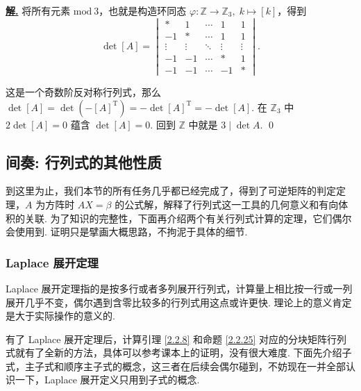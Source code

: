 \documentclass[10pt,openany]{article}
\theoremstyle{thmstyle} %
\theoremstyle{defstyle} %
\theoremstyle{prostyle} %
\theoremstyle{exastyle}
\theoremstyle{remstyle}
\newenvironment{solution}{\par\underline{\textbf{解.}} \;\fangsong}{\qed\par}
\newcommand{\T}{^{\text{T}}}
\begin{document}
\begin{solution}
	将所有元素 \( \text{mod} \ 3 \)，也就是构造环同态 \( \varphi: \mathbb{Z} \to \mathbb{Z}_3, \; k \mapsto [k] \)，得到
	\[ \det [A]=\begin{vmatrix}
		* & 1 & \cdots & 1 & 1 \\
		-1 & * & \cdots & 1 & 1 \\
		\vdots & \vdots & \ddots & \vdots & \vdots \\
		-1 & -1 & \cdots & * & 1 \\
		-1 & -1 & \cdots & -1 & *
	\end{vmatrix}.  \]
	
	这是一个奇数阶反对称行列式，那么 \( \det [A]=\det (-[A]\T)= -\det [A]\T= -\det [A] \). 在 \( \mathbb{Z}_3 \) 中 \( 2\det [A]=0 \) 蕴含 \( \det [A]=0 \). 回到 \( \mathbb{Z} \) 中就是 \( 3 \mid \det A \).
\end{solution}



\subsection{间奏: 行列式的其他性质}

到这里为止，我们本节的所有任务几乎都已经完成了，得到了可逆矩阵的判定定理，\( A \) 为方阵时 \( AX=\beta \) 的公式解，解释了行列式这一工具的几何意义和有向体积的关联. 为了知识的完整性，下面再介绍两个有关行列式计算的定理，它们偶尔会使用到. 证明只是擘画大概思路，不拘泥于具体的细节.

\subsubsection{Laplace 展开定理}

Laplace 展开定理指的是按多行或者多列展开行列式，计算量上相比按一行或一列展开几乎不变，偶尔遇到含零比较多的行列式用这点或许更快. 理论上的意义肯定是大于实际操作的意义的.

有了 Laplace 展开定理后，计算引理 \ref{2.2.8} 和命题 \ref{2.2.25} 对应的分块矩阵行列式就有了全新的方法，具体可以参考课本上的证明，没有很大难度. 下面先介绍子式，主子式和顺序主子式的概念，这三者在后续会偶尔碰到，不妨现在一并全部认识一下，Laplace 展开定义只用到子式的概念. 
\end{document}
